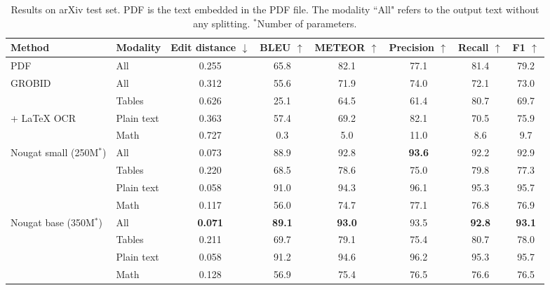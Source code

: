 \documentclass[]{article}
\begin{document}
\begin{table}
\setlength\extrarowheight{2pt}
\centering
\begin{tabular}{l|lcccccc}
\toprule
Method & Modality & Edit distance $\downarrow$ & BLEU $\uparrow$ & METEOR $\uparrow$ & Precision $\uparrow$ & Recall $\uparrow$ & F1 $\uparrow$ \\ \midrule
PDF                  & All      & 0.255 & 65.8 & 82.1 & 77.1 & 81.4 & 79.2 \\ \midrule
GROBID               & All      & 0.312 & 55.6 & 71.9 & 74.0 & 72.1 & 73.0 \\ \cline{2-8}
                     &Tables    & 0.626 & 25.1 & 64.5 & 61.4 & 80.7 & 69.7 \\
+ LaTeX OCR %
                     & Plain text &0.363 & 57.4 & 69.2 & 82.1 & 70.5 & 75.9 \\
                     & Math     & 0.727 & 0.3 & 5.0 & 11.0 & 8.6 & 9.7 \\ \midrule
\multirow{4}{*}{Nougat small (250M$^\ast$)} & All & 0.073 & 88.9 & 92.8 & \bf 93.6 & 92.2 & 92.9 \\ \cline{2-8}
                     & Tables     & 0.220 & 68.5 & 78.6 & 75.0 & 79.8 & 77.3 \\
                     & Plain text & 0.058 & 91.0 & 94.3 & 96.1 & 95.3 & 95.7 \\
                     & Math      & 0.117 & 56.0 & 74.7 & 77.1 & 76.8 & 76.9 \\\midrule
\multirow{4}{*}{Nougat base (350M$^\ast$)} & All & \bf 0.071 & \bf 89.1 & \bf 93.0 & 93.5 & \bf 92.8 & \bf 93.1 \\ \cline{2-8}
                     & Tables     & 0.211 & 69.7 & 79.1 & 75.4 & 80.7 & 78.0 \\ 
                     & Plain text & 0.058         & 91.2 & 94.6   & 96.2      & 95.3   & 95.7 \\
                     & Math       & 0.128         & 56.9 & 75.4   & 76.5      & 76.6   & 76.5 \\ \bottomrule
\end{tabular}
\vspace{1mm}
\caption{Results on arXiv test set. PDF is the text embedded in the PDF file. The modality ``All" refers to the output text without any splitting. $^\ast$Number of parameters.}
\label{tab:results_detailed}
\end{table}
\end{document}
